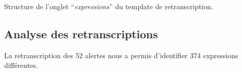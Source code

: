 \begin{table}
  \centering
  
  \caption{Structure de l'onglet \enquote{\emph{expressions}} du
    template de retranscription.}
  \label{tab:struct_temp}
\end{table}

\subsection{Analyse des retranscriptions}

La retranscription des 52 alertes nous a permis d'identifier 374
expressions différentes.

